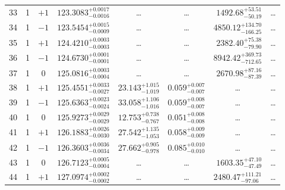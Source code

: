 \begin{table*}[!]
\begin{tabular}{llcrrlrc}
33 & 1 & $+1$ & $    123.3083_{-      0.0016}^{+      0.0017}$ & \multicolumn{1}{c}{\dots} & \multicolumn{1}{c}{\dots} & $     1492.68_{-       50.19}^{+       53.51}$ & \dots \\[1pt]
34 & 1 & $-1$ & $    123.5454_{-      0.0009}^{+      0.0015}$ & \multicolumn{1}{c}{\dots} & \multicolumn{1}{c}{\dots} & $     4850.12_{-      166.25}^{+      134.70}$ & \dots \\[1pt]
35 & 1 & $+1$ & $    124.4210_{-      0.0003}^{+      0.0003}$ & \multicolumn{1}{c}{\dots} & \multicolumn{1}{c}{\dots} & $     2382.40_{-       79.90}^{+       75.38}$ & \dots \\[1pt]
36 & 1 & $-1$ & $    124.6730_{-      0.0001}^{+      0.0001}$ & \multicolumn{1}{c}{\dots} & \multicolumn{1}{c}{\dots} & $     8942.42_{-      712.65}^{+      369.73}$ & \dots \\[1pt]
37 & 1 & 0 & $    125.0816_{-      0.0004}^{+      0.0003}$ & \multicolumn{1}{c}{\dots} & \multicolumn{1}{c}{\dots} & $     2670.98_{-       87.39}^{+       87.16}$ & \dots\\[1pt]
38 & 1 & $+1$ & $    125.4551_{-      0.0027}^{+      0.0033}$ & $      23.143_{-       1.019}^{+       1.015}$ & $       0.059_{-       0.007}^{+       0.007}$ & \multicolumn{1}{c}{\dots} & \dots\\[1pt]
39 & 1 & $-1$ & $    125.6363_{-      0.0024}^{+      0.0023}$ & $      33.058_{-       1.016}^{+       1.106}$ & $       0.059_{-       0.007}^{+       0.008}$ & \multicolumn{1}{c}{\dots} & \dots\\[1pt]
40 & 1 & 0 & $    125.9273_{-      0.0029}^{+      0.0029}$ & $      12.753_{-       0.767}^{+       0.738}$ & $       0.051_{-       0.008}^{+       0.008}$ & \multicolumn{1}{c}{\dots} & \dots\\[1pt]
41 & 1 & $+1$ & $    126.1883_{-      0.0030}^{+      0.0026}$ & $      27.542_{-       1.053}^{+       1.135}$ & $       0.058_{-       0.009}^{+       0.009}$ & \multicolumn{1}{c}{\dots} & \dots\\[1pt]
42 & 1 & $-1$ & $    126.3603_{-      0.0034}^{+      0.0036}$ & $      27.662_{-       0.978}^{+       0.905}$ & $       0.085_{-       0.010}^{+       0.010}$ & \multicolumn{1}{c}{\dots} & \dots\\[1pt]
43 & 1 & 0 & $    126.7123_{-      0.0004}^{+      0.0005}$ & \multicolumn{1}{c}{\dots} & \multicolumn{1}{c}{\dots} & $     1603.35_{-       47.49}^{+       47.10}$ & \dots\\[1pt]
44 & 1 & $+1$ & $    127.0974_{-      0.0002}^{+      0.0002}$ & \multicolumn{1}{c}{\dots} & \multicolumn{1}{c}{\dots} & $     2480.47_{-       97.06}^{+      111.21}$ & \dots \\[1pt]

\end{tabular}
\end{table*}

